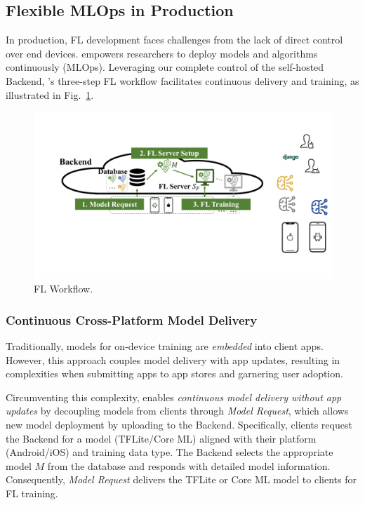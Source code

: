 \documentclass[conference]{IEEEtran}
\begin{document}
\subsection{Flexible MLOps in Production}
\label{sec:mlops}
\newcommand{\model}{$M$}
\newcommand{\fs}{$S_\mathrm F$}
In production,
FL development faces challenges from
the lack of direct control over end devices.
\FedKit{} empowers researchers to deploy models and algorithms continuously (MLOps).
Leveraging our complete control of the self-hosted Backend,
\FedKit{}'s three-step FL workflow
facilitates continuous delivery and training,
as illustrated in Fig.~\ref{fig:fl-workflow}.

\begin{figure}
    \centering
    \includegraphics*[width=0.9\linewidth]{fl_workflow.pdf}
    \caption{\FedKit{} FL Workflow.}
    \label{fig:fl-workflow}
\end{figure}

\subsubsection{Continuous Cross-Platform Model Delivery}
Traditionally, models for on-device training are \textit{embedded} into client apps.
However, this approach couples model delivery with app updates,
resulting in complexities when submitting apps to app stores and garnering user adoption.

Circumventing this complexity,
\FedKit{} enables \textit{continuous model delivery without app updates} by
decoupling models from clients through \textit{Model Request},
which allows new model deployment by uploading to the Backend.
Specifically, clients request the Backend for a model (TFLite/Core ML)
aligned with
their platform (Android/iOS) and training data type.
The Backend selects the appropriate model \model{} from the database and
responds with detailed model information.
Consequently, \textit{Model Request} delivers the TFLite or Core ML model
to clients for FL training.
\end{document}
